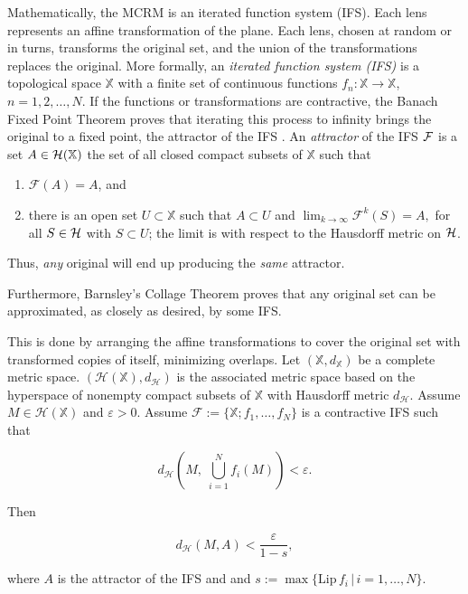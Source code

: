 \documentclass[english,11pt,letterpaper,onecolumn]{scrartcl}
\numberwithin{equation}{section}
\newcommand{\st}{\,|\,}
\newcommand{\X}{\mathbb{X}}
\newcommand{\cF}{\mathcal{F}}
\newcommand{\calH}{\mathcal{H}}
\newcommand{\be}{\begin{equation}}
\newcommand{\ee}{\end{equation}}
\begin{document}
Mathematically, the MCRM is an iterated function system (IFS). Each lens
represents an affine transformation of the plane. Each lens, chosen at random
or in turns, transforms the original set, and the union of the transformations
replaces the original. More formally, an \emph{iterated function system (IFS)}
is a topological space $\mathbb{X}$ with a finite set of continuous functions
$f_{n}:\X\rightarrow \X$,
$n=1,2,\dots,N$. If the functions or transformations are contractive, the
Banach Fixed Point Theorem proves that iterating this process to infinity
brings the original to a fixed point, the attractor of the IFS
\cite{chaosandfractals, barnsley1985iterated, 10.2307/24893080,
fractalseverywhere}. An \emph{attractor} of the IFS $\cal{F}$ is a set
$A\in \cal{H}(\X)$ the set of all closed compact subsets of $\X$ such that

\begin{enumerate}
\item $\cF(A)=A$, and
\item there is an open set $U\subset \X$ such that $A\subset U$ and
$\lim_{k\rightarrow\infty}\mathcal{F}^{k}(S)=A,$ for all $S\in \cal{H}$ with
$S\subset U$; the limit is with respect to the Hausdorff metric on $\cal{H}$.
\end{enumerate}

\noindent Thus, \textit{any} original will end up producing the
\textit{same} attractor.

Furthermore, Barnsley's Collage Theorem \cite{barnsley:1986:solution} proves
that any original set can be approximated, as closely as desired, by some IFS.

This is done by arranging the affine transformations to cover the original set
with transformed copies of itself, minimizing overlaps. Let
$(\mathbb{X},d_\mathbb{X})$ be a complete metric space. $(\calH (\X),
d_\calH)$
is the associated metric space based on the hyperspace of nonempty compact
subsets of $\X$ with Hausdorff metric $d_\calH$. Assume $M\in\calH(\X)$ and
$\varepsilon > 0$. Assume $\cF := \{\X; f_1, \ldots, f_N\}$ is a contractive
IFS such that

\be\label{hutchop}
d_\calH \left(M, \;\bigcup_{i=1}^N f_i (M) \right) < \varepsilon.
\ee

\noindent Then

\[
d_\calH (M, A) < \frac{\varepsilon}{1-s},
\]

\noindent where $A$ is the attractor of the IFS and  and $s :=
\max\{\mathrm{Lip}\,f_i\st
i = 1, \ldots, N\}$.
\end{document}
